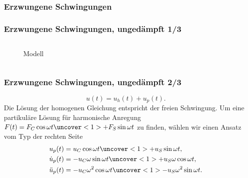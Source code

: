\documentclass[hyperref={pdfpagemode=FullScreen, colorlinks=false}]{beamer}
\begin{document}
\subsubsection{Erzwungene Schwingungen}
\begin{frame}
\frametitle{Erzwungene Schwingungen, {\normalsize ungedämpft 1/3}}
\begin{columns}
        \begin{column}[t]{.5\linewidth}
        \begin{figure}

\caption*{Modell }
\end{figure}
        \end{column}
		\hfill
		\begin{column}[t]{.5\linewidth}
		\end{column}
\end{columns}
\end{frame}

\begin{frame}
\frametitle{Erzwungene Schwingungen, {\normalsize ungedämpft 2/3}}
\begin{equation*}
 u(t)=u_h(t)+u_p(t).
\end{equation*}
Die Lösung der homogenen Gleichung entspricht der freien Schwingung. Um eine partikuläre Lösung für harmonische Anregung $F(t)=F_C\cos\omega t\uncover<1>{+F_S\sin\omega t}$ zu finden, wählen wir einen Ansatz vom Typ der rechten Seite
\begin{align*}
u_p(t)&=u_C\cos\omega t\uncover<1>{+u_S\sin\omega t},\\
\dot{u}_p(t)&=-u_C\omega\sin\omega t\uncover<1>{+u_S\omega\cos\omega t},\\
\ddot{u}_p(t)&=-u_C\omega^2\cos\omega t\uncover<1>{-u_S\omega^2\sin\omega t}.\\
\end{align*}
\end{frame}
\end{document}
